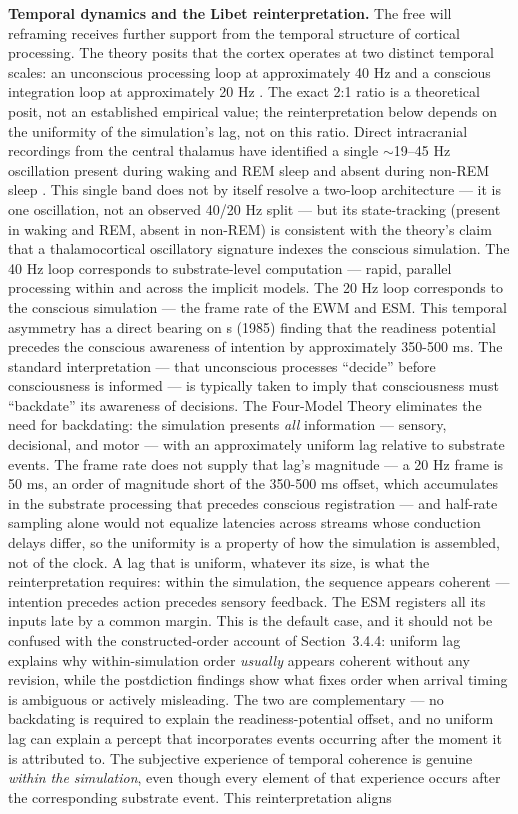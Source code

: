 \documentclass[12pt]{article}
\begin{document}
\textbf{Temporal dynamics and the Libet reinterpretation.} The free will reframing receives further support from the temporal structure of cortical processing. The theory posits that the cortex operates at two distinct temporal scales: an unconscious processing loop at approximately 40 Hz and a conscious integration loop at approximately 20 Hz \citep[cf.][]{Gruber2015,Llinas1993,Engel2001}. The exact 2:1 ratio is a theoretical posit, not an established empirical value; the reinterpretation below depends on the uniformity of the simulation's lag, not on this ratio. Direct intracranial recordings from the central thalamus have identified a single $\sim$19--45 Hz oscillation present during waking and REM sleep and absent during non-REM sleep \citep{Chowdhury2026}. This single band does not by itself resolve a two-loop architecture --- it is one oscillation, not an observed 40/20 Hz split --- but its state-tracking (present in waking and REM, absent in non-REM) is consistent with the theory's claim that a thalamocortical oscillatory signature indexes the conscious simulation. The 40 Hz loop corresponds to substrate-level computation --- rapid, parallel processing within and across the implicit models. The 20 Hz loop corresponds to the conscious simulation --- the frame rate of the EWM and ESM. This temporal asymmetry has a direct bearing on \citeauthor{Libet1985}\textquotesingle s (1985) finding that the readiness potential precedes the conscious awareness of intention by approximately 350-500 ms. The standard interpretation --- that unconscious processes ``decide'' before consciousness is informed --- is typically taken to imply that consciousness must ``backdate'' its awareness of decisions. The Four-Model Theory eliminates the need for backdating: the simulation presents \emph{all} information --- sensory, decisional, and motor --- with an approximately uniform lag relative to substrate events. The frame rate does not supply that lag's magnitude --- a 20 Hz frame is 50 ms, an order of magnitude short of the 350-500 ms offset, which accumulates in the substrate processing that precedes conscious registration --- and half-rate sampling alone would not equalize latencies across streams whose conduction delays differ, so the uniformity is a property of how the simulation is assembled, not of the clock. A lag that is uniform, whatever its size, is what the reinterpretation requires: within the simulation, the sequence appears coherent --- intention precedes action precedes sensory feedback. The ESM registers all its inputs late by a common margin. This is the default case, and it should not be confused with the constructed-order account of Section~3.4.4: uniform lag explains why within-simulation order \emph{usually} appears coherent without any revision, while the postdiction findings show what fixes order when arrival timing is ambiguous or actively misleading. The two are complementary --- no backdating is required to explain the readiness-potential offset, and no uniform lag can explain a percept that incorporates events occurring after the moment it is attributed to. The subjective experience of temporal coherence is genuine \emph{within the simulation}, even though every element of that experience occurs after the corresponding substrate event. This reinterpretation aligns 
\end{document}
